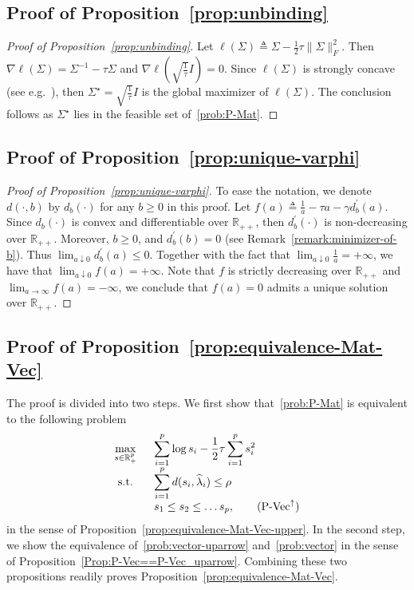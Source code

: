 \documentclass[11pt]{article}
\def\R{\mathbb{R}}
\newcommand{\opt}{^\star}
\newcommand{\Let}{\triangleq}
\def\st{\text{s.t.}}
\def\R{\mathbb{R}}
\newcommand{\half}{\frac{1}{2}}
\begin{document}
\subsection{Proof of Proposition~\ref{prop:unbinding}}
\begin{proof}[Proof of Proposition~\ref{prop:unbinding}]
    Let $\ell(\Sigma)\Let \Sigma - \half \tau \| \Sigma \|_F^2$. 
    Then $\nabla \ell(\Sigma) = \Sigma^{-1} - \tau \Sigma$ and 
    $\nabla \ell\left(\sqrt{\frac{1}{\tau}} I\right) = 0$. Since 
    $\ell(\Sigma)$ is strongly concave (see e.g.~\citet[Page 74]{ref:boyd2004convex}), then $\Sigma\opt =\sqrt{\frac{1}{\tau}} I$ is the global maximizer of $\ell(\Sigma)$. The conclusion follows as  $\Sigma\opt$ lies in the feasible set of~\eqref{prob:P-Mat}.
\end{proof}

\subsection{Proof of Proposition~\ref{prop:unique-varphi}}
\begin{proof}[Proof of Proposition~\ref{prop:unique-varphi}]
    To ease the notation, we denote $d(\cdot,b)$ by $d_b(\cdot)$ for any $b\geq 0$ in this proof. Let $f(a) \Let \frac{1}{a}-\tau a-\gamma d^\prime_b(a)$. Since $d_b(\cdot)$ is convex and differentiable over $\R_{++}$, then  $d_b^\prime(\cdot)$ is non-decreasing over $\R_{++}$.
    Moreover,  $b\geq 0$, and $d^\prime_b(b)=0$ (see Remark~\ref{remark:minimizer-of-b}). Thus  $\lim_{a\downarrow 0}d^\prime_b(a) \leq 0$. Together with the fact that $\lim_{a\downarrow 0} \frac{1}{a}=+\infty$, we have that $\lim_{a\downarrow 0} f(a) =+\infty$. Note that $f$ is strictly decreasing over $\R_{++}$ and $\lim_{a\to\infty} f(a) = -\infty$, we conclude that $f(a) = 0$ admits a unique solution over $\R_{++}$.
\end{proof}
\subsection{Proof of Proposition~\ref{prop:equivalence-Mat-Vec}}
The proof is divided into two steps. We first show that~\eqref{prob:P-Mat} is equivalent to the following problem
\begin{equation}
\begin{array}{cl}
     \displaystyle\max_{s\in\R^p_+}\;\;&\displaystyle\sum_{i=1}^p \log s_i - \frac{1}{2}\tau \sum_{i=1}^p s_i^2 \\
    \st\;\; &\displaystyle\sum_{i=1}^p d(s_i, \widehat{\lambda}_i)\leq  \rho\\
    &s_1\leq s_2\leq  \ldots s_p,\tag{$\text{P-Vec}^{\uparrow}$}
\end{array}\label{prob:vector-uparrow}
\end{equation}
in the sense of Proposition~\ref{prop:equivalence-Mat-Vec-upper}. In the second step, we show the equivalence of~\eqref{prob:vector-uparrow} and~\eqref{prob:vector} in the sense of Proposition~\ref{Prop:P-Vec==P-Vec_uparrow}. Combining these two propositions readily proves Proposition~\ref{prop:equivalence-Mat-Vec}.
\end{document}
